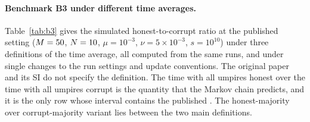 \documentclass[11pt]{article}
\begin{document}
\paragraph{Benchmark B3 under different time averages.} Table~\ref{tab:b3} gives the simulated
honest-to-corrupt ratio at the published setting ($M=50$, $N=10$, $\mu=10^{-3}$,
$\nu=5\times10^{-3}$, $s=10^{10}$) under three definitions of the time average, all computed from
the same \Nreps{} runs, and under single changes to the run settings and update conventions. The
original paper and its SI do not specify the definition. The time with all umpires honest over
the time with all umpires corrupt is the quantity that the Markov chain predicts, and it is the
only row whose interval contains the published \PaperRatio. The honest-majority over
corrupt-majority variant lies between the two main definitions.
\end{document}
